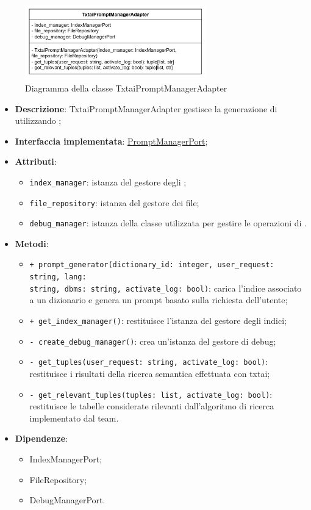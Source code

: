  \label{TxtaiPromptManagerAdapter}
\begin{figure}[H]
    \centering
    \includegraphics[width=0.7\textwidth]{assets/Backend/txtai_prompt_manager_adapter.png}
    \caption{Diagramma della classe TxtaiPromptManagerAdapter}
  \end{figure}
\begin{itemize}
    \item \textbf{Descrizione}: TxtaiPromptManagerAdapter gestisce la generazione di  utilizzando ;
    \item \textbf{Interfaccia implementata}: \hyperref[PromptManagerPort]{PromptManagerPort};
    \item \textbf{Attributi}:
    \begin{itemize}
        \item \texttt{index\_manager}: istanza del gestore degli ;
        \item \texttt{file\_repository}: istanza del gestore dei file;
        \item \texttt{debug\_manager}: istanza della classe utilizzata per gestire le operazioni di .
    \end{itemize}
    \item \textbf{Metodi}:
    \begin{itemize}
        \item \texttt{+ prompt\_generator(dictionary\_id: integer, user\_request: string, lang:\\ string, dbms: string, activate\_log: bool)}: carica l'indice associato a un dizionario e genera un prompt basato sulla richiesta dell'utente;
        \item \texttt{+ get\_index\_manager()}: restituisce l'istanza del gestore degli indici;
        \item \texttt{- create\_debug\_manager()}: crea un'istanza del gestore di debug;
        \item \texttt{- get\_tuples(user\_request: string, activate\_log: bool)}: restituisce i risultati della ricerca semantica effettuata con txtai;
        \item \texttt{- get\_relevant\_tuples(tuples: list, activate\_log: bool)}: restituisce le tabelle considerate rilevanti dall'algoritmo di ricerca implementato dal team.
    \end{itemize}
    \item \textbf{Dipendenze}:
    \begin{itemize}
        \item IndexManagerPort;
        \item FileRepository;
        \item DebugManagerPort.
    \end{itemize}
\end{itemize} 

